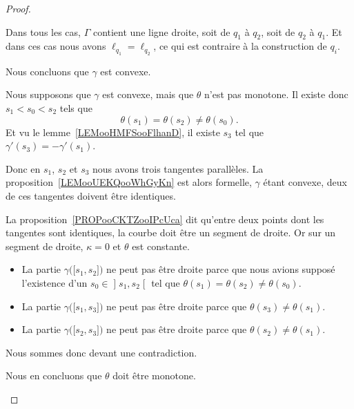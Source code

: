 \begin{proof}
\begin{subproof}
		Dans tous les cas, \( \Gamma\) contient une ligne droite, soit de \( q_1\) à \( q_2\), soit de \( q_2\) à \( q_1\). Et dans ces cas nous avons \( \ell_{q_1}=\ell_{q_2}\), ce qui est contraire à la construction de \( q_i\).

		Nous concluons que \( \gamma\) est convexe.

		\spitem[\( \Leftarrow\)]

		Nous supposons que \( \gamma\) est convexe, mais que \( \theta\) n'est pas monotone. Il existe donc \( s_1<s_0<s_2\) tels que
		\begin{equation}
			\theta(s_1)=\theta(s_2)\neq \theta(s_0).
		\end{equation}
		Et vu le lemme~\ref{LEMooHMFSooFlhanD}, il existe \( s_3\) tel que \( \gamma'(s_3)=-\gamma'(s_1)\).

		Donc en \( s_1\), \( s_2\) et \( s_3\) nous avons trois tangentes parallèles. La proposition~\ref{LEMooUEKQooWhGyKn} est alors formelle, \( \gamma\) étant convexe, deux de ces tangentes doivent être identiques.

		La proposition~\ref{PROPooCKTZooIPcUca} dit qu'entre deux points dont les tangentes sont identiques, la courbe doit être un segment de droite. Or sur un segment de droite, \( \kappa=0\) et \( \theta\) est constante.

		\begin{itemize}
			\item
			      La partie \( \gamma\big( \mathopen[ s_1 , s_2 \mathclose] \big)\) ne peut pas être droite parce que nous avions supposé l'existence d'un \( s_0\in \mathopen] s_1 , s_2 \mathclose[\) tel que \( \theta(s_1)=\theta(s_2)\neq \theta(s_0)\).

			\item
			      La partie \( \gamma\big( \mathopen[ s_1 , s_3 \mathclose] \big)\) ne peut pas être droite parce que \( \theta(s_3)\neq \theta(s_1)\).
			\item
			      La partie \( \gamma\big( \mathopen[ s_2 , s_3 \mathclose] \big)\) ne peut pas être droite parce que \( \theta(s_2)\neq \theta(s_1)\).
		\end{itemize}
		Nous sommes donc devant une contradiction.

		Nous en concluons que \( \theta\) doit être monotone.
	\end{subproof}
\end{proof}

